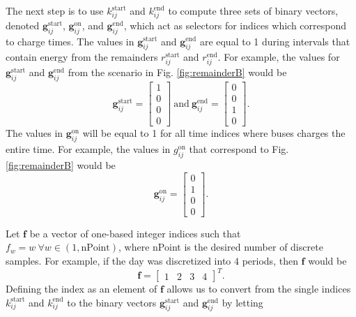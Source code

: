 The next step is to use $k_{ij}^{\text{start}}$ and $k_{ij}^{\text{end}}$ to compute three sets of binary vectors, denoted $\mathbf{g}^{\text{start}}_{ij}$, $\mathbf{g}^{\text{on}}_{ij}$, and $\mathbf{g}^{\text{end}}_{ij}$, which act as selectors for indices which correspond to charge times. The values in $\mathbf{g}_{ij}^{\text{start}}$ and $\mathbf{g}_{ij}^{\text{end}}$ are equal to 1 during intervals that contain energy from the remainders $r_{ij}^{\text{start}}$ and $r_{ij}^{\text{end}}$. For example, the values for $\mathbf{g}_{ij}^{\text{start}}$ and $\mathbf{g}_{ij}^{\text{end}}$ from the scenario in Fig. \ref{fig:remainderB} would be 
\begin{equation}
	\mathbf{g}_{ij}^{\text{start}} = \begin{bmatrix}1 \\ 0 \\ 0 \\ 0 \end{bmatrix} \ \text{and} \ \mathbf{g}_{ij}^{\text{end}} = \begin{bmatrix}0 \\ 0 \\ 1 \\ 0 \end{bmatrix}.
\end{equation}
The values in $\mathbf{g}_{ij}^{\text{on}}$ will be equal to 1 for all time indices where buses charges the entire time. For example, the values in $g_{ij}^{\text{on}}$ that correspond to Fig. \ref{fig:remainderB} would be 
\begin{equation}
	\mathbf{g}_{ij}^{\text{on}} = \begin{bmatrix}0 \\ 1 \\ 0 \\ 0 \end{bmatrix}.
\end{equation}
\par Let $\mathbf{f}$ be a vector of one-based integer indices such that $f_w = w \ \forall w \in (1,\text{nPoint})$, where nPoint is the desired number of discrete samples. For example, if the day was discretized into $4$ periods, then $\mathbf{f}$ would be 
\begin{equation}
	\mathbf{f} = \begin{bmatrix}1 & 2 & 3 & 4 \end{bmatrix}^T.
\end{equation}
Defining the index as an element of $\mathbf{f}$ allows us to convert from the single indices $k_{ij}^{\text{start}}$ and $k_{ij}^{\text{end}}$ to the binary vectors $\mathbf{g}_{ij}^{\text{start}}$ and $\mathbf{g}_{ij}^{\text{end}}$ by letting 
